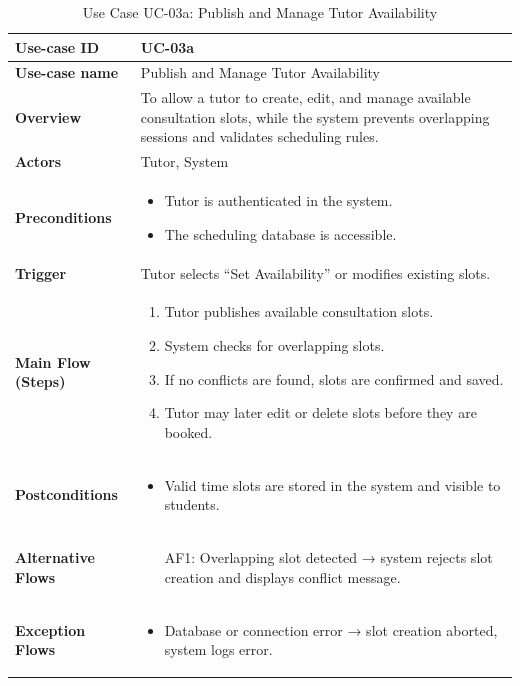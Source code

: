 \begin{table}[H]
\centering
\renewcommand{\arraystretch}{1.3}
\begin{tabular}{|p{3cm}|p{11cm}|}
\hline
\textbf{Use-case ID} & UC-03a \\
\hline
\textbf{Use-case name} & Publish and Manage Tutor Availability \\
\hline
\textbf{Overview} & To allow a tutor to create, edit, and manage available consultation slots, while the system prevents overlapping sessions and validates scheduling rules. \\
\hline
\textbf{Actors} & Tutor, System \\
\hline
\textbf{Preconditions} &
\begin{itemize}
    \item Tutor is authenticated in the system.
    \item The scheduling database is accessible.
\end{itemize} \\
\hline
\textbf{Trigger} & Tutor selects “Set Availability” or modifies existing slots. \\
\hline
\textbf{Main Flow (Steps)} &
\begin{enumerate}
    \item Tutor publishes available consultation slots.
    \item System checks for overlapping slots.
    \item If no conflicts are found, slots are confirmed and saved.
    \item Tutor may later edit or delete slots before they are booked.
\end{enumerate} \\
\hline
\textbf{Postconditions} &
\begin{itemize}
    \item Valid time slots are stored in the system and visible to students.
\end{itemize} \\
\hline
\textbf{Alternative Flows} &
\begin{itemize}
    \item[AF1:] Overlapping slot detected → system rejects slot creation and displays conflict message.
\end{itemize} \\
\hline
\textbf{Exception Flows} &
\begin{itemize}
    \item Database or connection error → slot creation aborted, system logs error.
\end{itemize} \\
\hline
\end{tabular}
\caption{Use Case UC-03a: Publish and Manage Tutor Availability}
\end{table}


